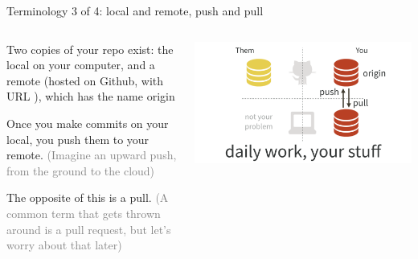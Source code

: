 \documentclass[ignorenonframetext, 10pt, aspectratio=169]{beamer}
\begin{document}
\begin{frame}{Terminology 3 of 4: local and remote, push and pull}
\begin{columns}
\begin{column}{0.5\textwidth}
\begin{wideitemize}
\item Two copies of your repo exist: the \alert{local} on your computer, and a \alert{remote} (hosted on Github, with URL ), \pause which has the name \alert{origin}
\item Once you make commits on your local, you \alert{push} them to your remote. \textcolor{gray}{(Imagine an upward push, from the ground to the cloud)}
\item The opposite of this is a \alert{pull}. \textcolor{gray}{(A common term that gets thrown around is a \alert{pull request}, but let's worry about that later)}
\end{wideitemize}
\end{column}
\begin{column}{0.5\textwidth}
\includegraphics[width = \linewidth]{pull-push-yours.png}
\end{column}
\end{columns}
\end{frame}
\end{document}
